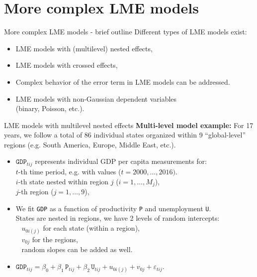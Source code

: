 \documentclass{beamer}
\begin{document}
\section{More complex LME models}
\begin{frame}{More complex LME models - brief outline}
Different types of LME models exist:\\
\bigskip
\begin{itemize}
\item LME models with (multilevel) nested effects,
\medskip
\item LME models with crossed effects,
\medskip
\item Complex behavior of the error term in LME models can be addressed.
\medskip
\item LME models with non-Gaussian dependent variables \\(binary, Poisson, etc.).
\end{itemize}
\end{frame}
\begin{frame}{LME models with multilevel nested effects}
\textbf{Multi-level model example:} For 17 years, we follow a total of 86 individual states organized within 9 ``global-level'' regions (e.g. South America, Europe, Middle East, etc.).
\medskip
\begin{itemize}
\item $\texttt{GDP}_{tij}$ represents individual GDP per capita measurements for:\\
\smallskip
$t$-th time period, e.g. with values ($t= 2000, \dots, 2016)$.\\
$i$-th state nested within region $j$ ($i=1,\dots,M_j$),\\
$j$-th region ($j=1,\dots,9$),\\
\medskip
\item We fit \texttt{GDP} as a function of productivity \texttt{P} and unemployment \texttt{U}.\\
\smallskip
States are nested in regions, we have 2 levels of random intercepts: \\
~ $u_{0i(j)}$ for each state (within a region),\\
~ $v_{0j}$ for the regions,\\
~ random slopes can be added as well.
\bigskip
\item $\texttt{GDP}_{tij} = \beta_0 + \beta_1 \, \texttt{P}_{tij} 
+ \beta_2 \, \texttt{U}_{tij} + u_{0i(j)} + v_{0j}  + \varepsilon_{tij}.$
\end{itemize}
\end{frame}
\end{document}
